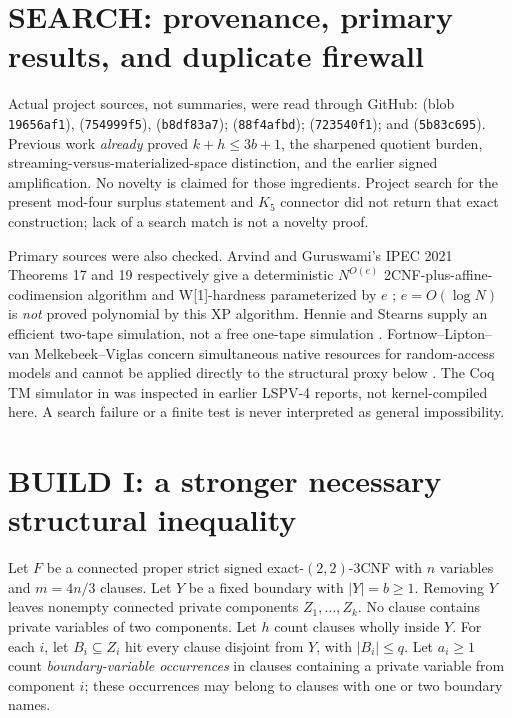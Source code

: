 \documentclass[11pt]{article}
\begin{document}
\section{SEARCH: provenance, primary results, and duplicate firewall}
Actual project sources, not summaries, were read through GitHub:  (blob \texttt{19656af1}),  (\texttt{754999f5}),  (\texttt{b8df83a7});  (\texttt{88f4afbd});  (\texttt{723540f1}); and  (\texttt{5b83c695}). Previous work \emph{already} proved $k+h\le3b+1$, the sharpened quotient burden, streaming-versus-materialized-space distinction, and the earlier signed amplification. No novelty is claimed for those ingredients. Project search for the present mod-four surplus statement and $K_5$ connector did not return that exact construction; lack of a search match is not a novelty proof.

Primary sources were also checked. Arvind and Guruswami's IPEC 2021 Theorems 17 and 19 respectively give a deterministic $N^{O(e)}$ 2CNF-plus-affine-codimension algorithm and W[1]-hardness parameterized by $e$ \cite{ag}; $e=O(\log N)$ is \emph{not} proved polynomial by this XP algorithm. Hennie and Stearns supply an efficient two-tape simulation, not a free one-tape simulation \cite{hs}. Fortnow--Lipton--van Melkebeek--Viglas concern simultaneous native resources for random-access models and cannot be applied directly to the structural proxy below \cite{flmv}. The Coq TM simulator in  was inspected in earlier LSPV-4 reports, not kernel-compiled here. A search failure or a finite test is never interpreted as general impossibility.

\section{BUILD I: a stronger necessary structural inequality}
Let $F$ be a connected proper strict signed exact-$(2,2)$-3CNF with $n$ variables and $m=4n/3$ clauses. Let $Y$ be a fixed boundary with $|Y|=b\ge1$. Removing $Y$ leaves nonempty connected private components $Z_1,\dots,Z_k$. No clause contains private variables of two components. Let $h$ count clauses wholly inside $Y$. For each $i$, let $B_i\subseteq Z_i$ hit every clause disjoint from $Y$, with $|B_i|\le q$. Let $a_i\ge1$ count \emph{boundary-variable occurrences} in clauses containing a private variable from component $i$; these occurrences may belong to clauses with one or two boundary names.
\end{document}
